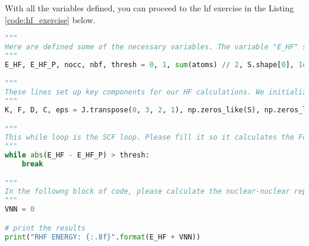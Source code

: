 With all the variables defined, you can proceed to the \acrshort{hf} exercise in the Listing \ref{code:hf_exercise} below.

\raggedbottom\begin{lstlisting}[language=Python, caption={\acrshort{hf} method exercise code.}, label=code:hf_exercise]
"""
Here are defined some of the necessary variables. The variable "E_HF" stores the Hartree-Fock energy, while "E_HF_P" keeps track of the previous iteration's energy to monitor convergence. The "thresh" defines the convergence criteria for the calculation. The variables "nocc" and "nbf" represent the number of occupied orbitals and the number of basis functions, respectively. Initially, "E_HF" is set to zero and "E_HF_P" to one to trigger the start of the Self-Consistent Field (SCF) loop. Although you can rename these variables, it is important to note that certain sections of the code are tailored to these specific names.
"""
E_HF, E_HF_P, nocc, nbf, thresh = 0, 1, sum(atoms) // 2, S.shape[0], 1e-8

"""
These lines set up key components for our HF calculations. We initialize the density matrix as a zero matrix, and the coefficients start as an empty array. Although the coefficient matrix is computed within the while loop, it's defined outside to allow for its use in subsequent calculations, such as the MP energy computation. Similarly, the exchange tensor is accurately calculated here by transposing the Coulomb tensor. The "eps" vector, which contains the orbital energies, is also defined at this stage to facilitate access throughout the script. This setup ensures that all necessary variables are ready for iterative processing and further calculations beyond the SCF loop.
"""
K, F, D, C, eps = J.transpose(0, 3, 2, 1), np.zeros_like(S), np.zeros_like(S), np.zeros_like(S), np.array(nbf * [0])

"""
This while loop is the SCF loop. Please fill it so it calculates the Fock matrix, solves the Fock equations, builds the density matrix from the coefficients and calculates the energy. You can use all the variables defined above and all the functions in numpy package. The recommended functions are np.einsum and np.linalg.eigh. Part of the calculation will probably be calculation of the inverse square root of a matrix. The numpy package does not conatin a function for this. You can find a library that can do that or you can do it manually. The manual calculation is, of course, preferred.
"""
while abs(E_HF - E_HF_P) > thresh:
    break

"""
In the followng block of code, please calculate the nuclear-nuclear repulsion energy. You should use only the atoms and coords variables. The code can be as short as two lines. The result should be stored in the "VNN" variable.
"""
VNN = 0

# print the results
print("RHF ENERGY: {:.8f}".format(E_HF + VNN))
\end{lstlisting}

